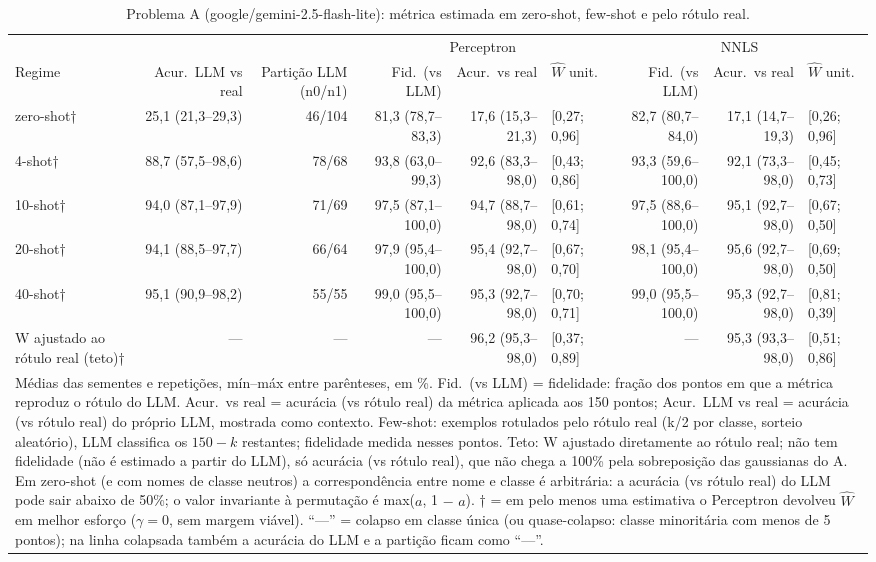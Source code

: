 \begin{table}[htbp]
\centering
\small
\caption{Problema A (google/gemini-2.5-flash-lite): métrica estimada em zero-shot, few-shot e pelo rótulo real.}
\label{tab:T1_A_flashlite}
\begin{tabular}{lrrrrlrrl}
\toprule
 &  &  & \multicolumn{3}{c}{Perceptron} & \multicolumn{3}{c}{NNLS} \\ \cmidrule(lr){4-6} \cmidrule(lr){7-9}
Regime & Acur.\ LLM vs real & Partição LLM (n0/n1) & Fid.\ (vs LLM) & Acur.\ vs real & $\hat{W}$ unit. & Fid.\ (vs LLM) & Acur.\ vs real & $\hat{W}$ unit. \\
\midrule
zero-shot† & 25,1 (21,3–29,3) & 46/104 & 81,3 (78,7–83,3) & 17,6 (15,3–21,3) & [0,27; 0,96] & 82,7 (80,7–84,0) & 17,1 (14,7–19,3) & [0,26; 0,96] \\
4-shot† & 88,7 (57,5–98,6) & 78/68 & 93,8 (63,0–99,3) & 92,6 (83,3–98,0) & [0,43; 0,86] & 93,3 (59,6–100,0) & 92,1 (73,3–98,0) & [0,45; 0,73] \\
10-shot† & 94,0 (87,1–97,9) & 71/69 & 97,5 (87,1–100,0) & 94,7 (88,7–98,0) & [0,61; 0,74] & 97,5 (88,6–100,0) & 95,1 (92,7–98,0) & [0,67; 0,50] \\
20-shot† & 94,1 (88,5–97,7) & 66/64 & 97,9 (95,4–100,0) & 95,4 (92,7–98,0) & [0,67; 0,70] & 98,1 (95,4–100,0) & 95,6 (92,7–98,0) & [0,69; 0,50] \\
40-shot† & 95,1 (90,9–98,2) & 55/55 & 99,0 (95,5–100,0) & 95,3 (92,7–98,0) & [0,70; 0,71] & 99,0 (95,5–100,0) & 95,3 (92,7–98,0) & [0,81; 0,39] \\
\midrule
W ajustado ao rótulo real (teto)† & — & — & — & 96,2 (95,3–98,0) & [0,37; 0,89] & — & 95,3 (93,3–98,0) & [0,51; 0,86] \\
\bottomrule
\multicolumn{9}{p{0.95\linewidth}}{\footnotesize Médias das sementes e repetições, mín–máx entre parênteses, em \%. Fid.\ (vs LLM) = fidelidade: fração dos pontos em que a métrica reproduz o rótulo do LLM. Acur.\ vs real = acurácia (vs rótulo real) da métrica aplicada aos 150 pontos; Acur.\ LLM vs real = acurácia (vs rótulo real) do próprio LLM, mostrada como contexto. Few-shot: exemplos rotulados pelo rótulo real (k/2 por classe, sorteio aleatório), LLM classifica os $150-k$ restantes; fidelidade medida nesses pontos. Teto: W ajustado diretamente ao rótulo real; não tem fidelidade (não é estimado a partir do LLM), só acurácia (vs rótulo real), que não chega a 100\% pela sobreposição das gaussianas do A. Em zero-shot (e com nomes de classe neutros) a correspondência entre nome e classe é arbitrária: a acurácia (vs rótulo real) do LLM pode sair abaixo de 50\%; o valor invariante à permutação é max($a$, 1 $-$ $a$). † = em pelo menos uma estimativa o Perceptron devolveu $\hat{W}$ em melhor esforço ($\gamma = 0$, sem margem viável). ``—'' = colapso em classe única (ou quase-colapso: classe minoritária com menos de 5 pontos); na linha colapsada também a acurácia do LLM e a partição ficam como ``—''.} \\
\end{tabular}
\end{table}
